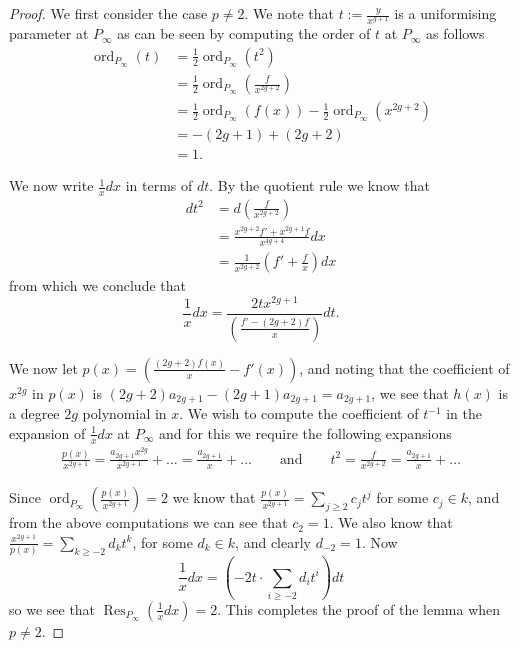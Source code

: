 \documentclass[draft, 11pt]{article} %
\theoremstyle{plain}
\theoremstyle{remark}
\DeclareMathOperator{\res}{Res}
\DeclareMathOperator{\ord}{ord}
\begin{document}
\begin{proof}

We first consider the case $p\neq 2$.
We note that $t:= \frac{y}{x^{g+1}}$ is a uniformising parameter at $P_\infty$ as can be seen by computing the order of $t$ at $P_\infty$ as follows
\begin{align}
\ord_{P_\infty}(t) & =  \frac{1}{2}\ord_{P_\infty}(t^2) \\
  & =  \frac{1}{2}\ord_{P_\infty}\left( \frac{f}{x^{2g+2}} \right) \\
& =  \frac{1}{2}\ord_{P_\infty}(f(x)) - \frac{1}{2}\ord_{P_\infty}(x^{2g+2})\\
& =  -(2g+1) + (2g+2) \\
& =  1.
\end{align}

We now write $\frac{1}{x}dx$ in terms of $dt$.
By the quotient rule we know that
\begin{align*}
dt^2 & =  d \left( \frac{f}{x^{2g+2}} \right) \\
& =  \frac{x^{2g+2}f' + x^{2g+1}f}{x^{4g+4}} dx \\
& =  \frac{1}{x^{2g+2}} \left( f' + \frac{f}{x} \right) dx
\end{align*}
from which we conclude that
\[
\frac{1}{x}dx = \frac{2tx^{2g+1}}{\left(\frac{f' - (2g+2)f}{x} \right)} dt.
\]


We now let $p(x) = \left(\frac{(2g+2)f(x)}{x} - f'(x)\right)$, and noting that the coefficient of $x^{2g}$ in $p(x)$ is $(2g+2)a_{2g+1} - (2g+1)a_{2g+1} = a_{2g+1}$, we see that $h(x)$ is a degree $2g$ polynomial in $x$.
We wish to compute the coefficient of $t^{-1}$ in the expansion of $\frac{1}{x}dx$ at $P_\infty$ and for this we require the following expansions
\begin{align}
\frac{p(x)}{x^{2g+1}} = \frac{a_{2g+1}x^{2g}}{x^{2g+1}} + \ldots = \frac{a_{2g+1}}{x} + \ldots \qquad \text{and} \qquad t^2 = \frac{f}{x^{2g+2} } = \frac{a_{2g+1}}{x} + \ldots
\end{align}

Since $\ord_{P_\infty}\left(\frac{p(x)}{x^{2g+1}}\right) = 2$ we know that $\frac{p(x)}{x^{2g+1}} = \sum_{j\geq 2} c_j t^j$ for some $c_j\in k$, and from the above computations we can see that $c_2 = 1$.
We also know that $\frac{x^{2g+1}}{p(x)} = \sum_{k\geq -2} d_kt^k$, for some $d_k\in k$, and clearly $d_{-2} = 1$.
Now
\[
\frac{1}{x}dx = \left( -2t \cdot \sum_{i\geq -2} d_it^i\right) dt 
\]
so we see that $\res_{P_\infty}\left( \frac{1}{x} dx\right) = 2$.
This completes the proof of the lemma when $p\neq 2$.


\end{proof}
\end{document}
